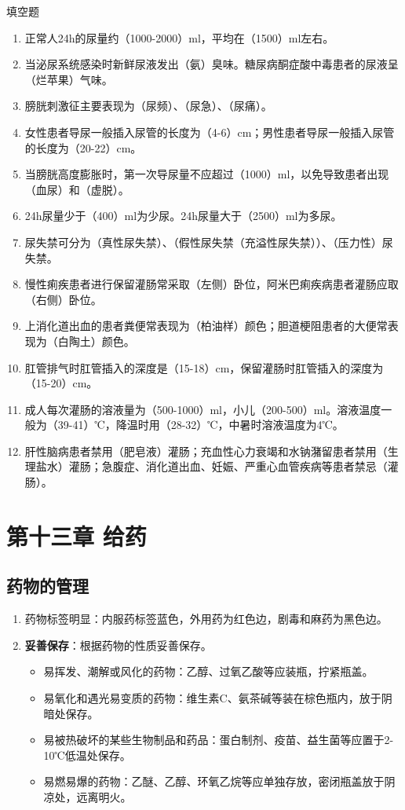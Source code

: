 \documentclass[11pt, a4paper]{ctexart}
\begin{document}
\begin{tipsbox}{填空题}
\begin{enumerate}
    \item 正常人24h的尿量约（1000-2000）ml，平均在（1500）ml左右。
    \item 当泌尿系统感染时新鲜尿液发出（氨）臭味。糖尿病酮症酸中毒患者的尿液呈（烂苹果）气味。
    \item 膀胱刺激征主要表现为（尿频）、（尿急）、（尿痛）。
    \item 女性患者导尿一般插入尿管的长度为（4-6）cm；男性患者导尿一般插入尿管的长度为（20-22）cm。
    \item 当膀胱高度膨胀时，第一次导尿量不应超过（1000）ml，以免导致患者出现（血尿）和（虚脱）。
    \item 24h尿量少于（400）ml为少尿。24h尿量大于（2500）ml为多尿。
    \item 尿失禁可分为（真性尿失禁）、（假性尿失禁（充溢性尿失禁））、（压力性）尿失禁。
    \item 慢性痢疾患者进行保留灌肠常采取（左侧）卧位，阿米巴痢疾病患者灌肠应取（右侧）卧位。
    \item 上消化道出血的患者粪便常表现为（柏油样）颜色；胆道梗阻患者的大便常表现为（白陶土）颜色。
    \item 肛管排气时肛管插入的深度是（15-18）cm，保留灌肠时肛管插入的深度为（15-20）cm。
    \item 成人每次灌肠的溶液量为（500-1000）ml，小儿（200-500）ml。溶液温度一般为（39-41）℃，降温时用（28-32）℃，中暑时溶液温度为4℃。
    \item 肝性脑病患者禁用（肥皂液）灌肠；充血性心力衰竭和水钠潴留患者禁用（生理盐水）灌肠；急腹症、消化道出血、妊娠、严重心血管疾病等患者禁忌（灌肠）。
\end{enumerate}
\end{tipsbox}

\section{第十三章 给药}
\subsection{药物的管理}
\begin{enumerate}
    \item 药物标签明显：内服药标签蓝色，外用药为红色边，剧毒和麻药为黑色边。
    \item \textbf{妥善保存}：根据药物的性质妥善保存。
    \begin{itemize}
        \item 易挥发、潮解或风化的药物：乙醇、过氧乙酸等应装瓶，拧紧瓶盖。
        \item 易氧化和遇光易变质的药物：维生素C、氨茶碱等装在棕色瓶内，放于阴暗处保存。
        \item 易被热破坏的某些生物制品和药品：蛋白制剂、疫苗、益生菌等应置于2-10℃低温处保存。
        \item 易燃易爆的药物：乙醚、乙醇、环氧乙烷等应单独存放，密闭瓶盖放于阴凉处，远离明火。
    \end{itemize}
\end{enumerate}
\end{document}
